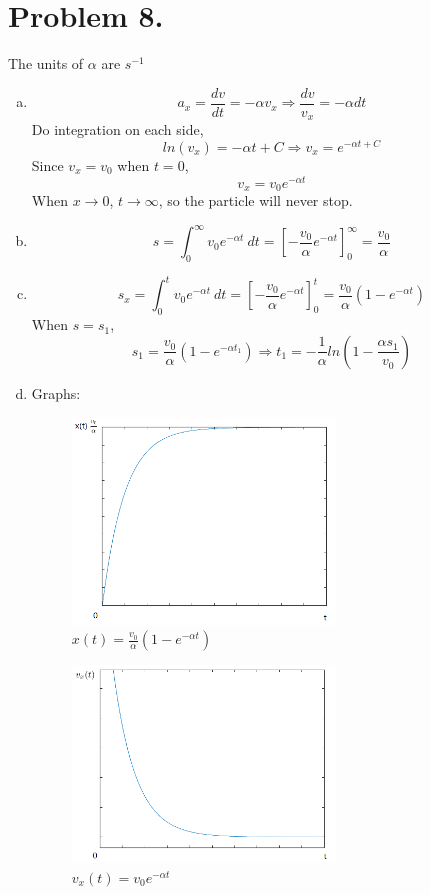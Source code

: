 \documentclass{article}
\begin{document}
\section*{Problem 8.}
The units of $\alpha$ are $s^{-1}$
\begin{enumerate}[(a)]
\item
$$a_x=\frac{dv}{dt}=-\alpha v_x\Longrightarrow\frac{dv}{v_x}=-\alpha dt$$
Do integration on each side,
$$ln(v_x)=-\alpha t+C\Longrightarrow v_x=e^{-\alpha t+C}$$
Since $v_x=v_0$ when $t=0$,
$$v_x=v_0e^{-\alpha t}$$
When $x\rightarrow 0$, $t\rightarrow \infty$, so the particle will never stop.
\item
$$s=\int_0^{\infty}v_0e^{-\alpha t}\ dt=\left[-\frac{v_0}{\alpha}e^{-\alpha t}\right]_0^{\infty}=\frac{v_0}{\alpha}$$
\item
$$s_x=\int_0^tv_0e^{-\alpha t}\ dt=\left[-\frac{v_0}{\alpha}e^{-\alpha t}\right]_0^t=\frac{v_0}{\alpha}(1-e^{-\alpha t})$$
When $s=s_1$,
$$s_1=\frac{v_0}{\alpha}(1-e^{-\alpha t_1}) \Longrightarrow t_1=-\frac{1}{\alpha}ln\left(1-\frac{\alpha s_1}{v_0}\right)$$
\item
Graphs:
\begin{figure}[h!]
    \centering
    \includegraphics[width=7cm]{x(t).png}
    \caption{$x(t)=\frac{v_0}{\alpha}(1-e^{-\alpha t})$}
    \label{fig-sample}
\end{figure}
\begin{figure}[h!]
    \centering
    \includegraphics[width=7cm]{v(t).png}
    \caption{$v_x(t)=v_0e^{-\alpha t}$}

\end{figure}
\end{enumerate}
\end{document}
